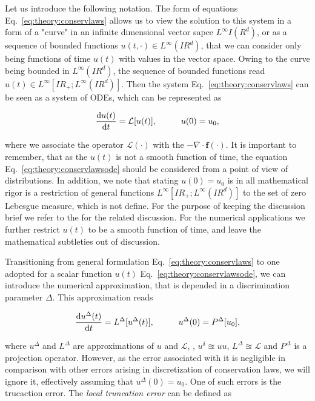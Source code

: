 Let us introduce the following notation. The form of equations Eq.~\eqref{eq:theory:conservlaws} allows us to view the solution to this system in a form of a "curve" in an infinite dimensional vector sapce $L^{\infty}I\!(R^d)$, or as a sequence of bounded functions $u(t,\cdot)\in L^{\infty}(I\! R^d)$, that we can consider only being functions of time $u(t)$ with values in the vector space. Owing to the curve being bounded in $L^{\infty}(I\!R^d)$, the sequence of bounded functions read $u(t)\in L^{\infty}[I\!R_{+};L^{\infty}(I\!R^d)]$. Then the system Eq.~\eqref{eq:theory:conservlaws} can be seen as a system of \acp{ODE}, which can be represented as 

\begin{equation}
\frac{\text{d}u(t)}{\text{d}t} = \mathcal{L}[u(t)], \hspace{10mm} u(0) = u_0,
\label{eq:theory:conservlawsode}
\end{equation}

where we associate the operator $\mathcal{L}(\cdot)$ with the $-\nabla\cdot\boldsymbol{f}(\cdot)$. It is important to remember, that as the $u(t)$ is not a smooth function of time, the equation Eq.~\eqref{eq:theory:conservlawsode} should be considered from a point of view of distributions. 
%
In addition, we note that stating $u(0) = u_0$ is in all mathematical rigor is a restriction of general functions $L^{\infty}[I\!R_{+};L^{\infty}(I\!R^d)]$ to the set of zero Lebesgue measure, which is not define. For the purpose of keeping the discussion brief we refer to the \citet{Kruzkov:1970} for the related discussion. For the numerical applications we further restrict $u(t)$ to be a smooth function of time, and leave the mathematical subtleties out of discussion.  

Transitioning from general formulation Eq.~\eqref{eq:theory:conservlaws} to one adopted for a scalar function $u(t)$ Eq.~\eqref{eq:theory:conservlawsode}, we can introduce the numerical approximation, that is depended in a discrimination parameter $\Delta$. 
%
This approximation reads

\begin{equation}
\frac{\text{d}u^{\Delta}(t)}{\text{d}t} = L^{\Delta}[u^{\Delta}(t)], \hspace{10mm} u^{\Delta}(0) = P^{\Delta}[u_0],
\label{eq:theory:conservlawsodepde}
\end{equation}

where $u^{\Delta}$ and $L^{\Delta}$ are approximations of $u$ and $\mathcal{L}$, \ie, $u^{\delta}\approxeq u u$, $L^{\Delta}\approxeq \mathcal{L}$ and $P^{\Delta}$ is a projection operator. 
However, as the error associated with it is negligible in comparison with other errors arising in discretization of conservation laws, we will ignore it, effectively assuming that $u^{\Delta}(0) = u_0$. 
One of such errors is the trucaction error. 
The \textit{ local truncation error} can be defined as 

